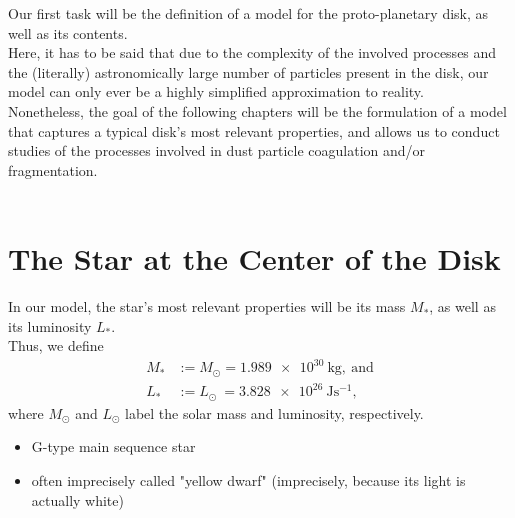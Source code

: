 Our first task will be the definition of a model for the proto-planetary disk, 
as well as its contents. \\

Here, it has to be said that due to the complexity of the involved processes and the (literally)
astronomically large number of particles present in the disk, our model can only ever be a highly
simplified approximation to reality. \\

Nonetheless, the goal of the following chapters will be the formulation of a model that captures
a typical disk's most relevant properties, and allows us to conduct studies of the processes
involved in dust particle coagulation and/or fragmentation. \\

 \\

\section{The Star at the Center of the Disk}

    In our model, the star's most relevant properties will be its mass $M_*$, as well as its
    luminosity $L_*$. \\

     Thus, we define
    \begin{align}
        M_*&:=M_\odot=\SI{1.989e30}{\kg},\ \text{and} \\
        L_*&:=L_\odot\ =\SI{3.828e26}{\joule\second^{-1}},
    \end{align}
    where $M_\odot$ and $L_\odot$ label the solar mass and luminosity, respectively. \\

    \begin{itemize}
        \item G-type main sequence star
        \item often imprecisely called "yellow dwarf" 
              (imprecisely, because its light is actually white)
    \end{itemize}
     \\

